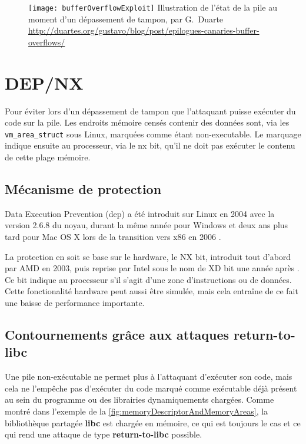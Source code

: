 \begin{figure}[H]
	\centering
	\texttt{[image: bufferOverflowExploit]}
	{Illustration de l'état de la pile au moment d'un dépassement de tampon, par G.~Duarte}
	{\url{http://duartes.org/gustavo/blog/post/epilogues-canaries-buffer-overflows/}}
	\label{fig:bufferOverflowExploit}
\end{figure}

\vfill

\section{DEP/NX}

Pour éviter lors d'un dépassement de tampon que l'attaquant puisse exécuter du code sur la pile. Les endroits mémoire censés contenir des données sont, via les \texttt{vm_area_struct} sous Linux, marquées comme étant non-executable. Le marquage indique ensuite au processeur, via le \gls{nx} bit, qu'il ne doit pas exécuter le contenu de cette plage mémoire.

\subsection{Mécanisme de protection}

Data Execution Prevention (\gls{dep}) a été introduit sur Linux en 2004 avec la version 2.6.8 du noyau, durant la même année pour Windows et deux ans plus tard pour Mac OS X lors de la transition vers x86 en 2006 \cite{DataExecutionPrevention}.

La protection en soit se base sur le hardware, le NX bit, introduit tout d'abord par AMD en 2003, puis reprise par Intel sous le nom de XD bit une année après \cite{ExecutableSpaceProtection} \cite{NXBit}. Ce bit indique au processeur s'il s'agit d'une zone d'instructions ou de données. Cette fonctionalité hardware peut aussi être simulée, mais cela entraîne de ce fait une baisse de performance importante.

\subsection{Contournements grâce aux attaques \og return-to-libc \fg}

Une pile non-exécutable ne permet plus à l'attaquant d'exécuter son code, mais cela ne l'empêche pas d'exécuter du code marqué comme exécutable déjà présent au sein du programme ou des librairies dynamiquements chargées. Comme montré dans l'exemple de la \autoref{fig:memoryDescriptorAndMemoryAreas}, la bibliothèque partagée \textbf{libc} est chargée en mémoire, ce qui est toujours le cas et ce qui rend une attaque de type \textbf{\og return-to-libc \fg} \cite{ReturntolibcAttack} possible.

